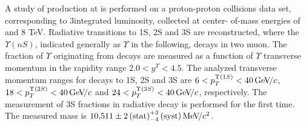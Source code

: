 A study of \chib production at \lhcb is performed on a proton-proton collisions
data set, corresponding to 3\invfb integrated luminosity, collected at center-
of-mass energies of  and 8 TeV. Radiative \chib transitions to
\Y1S, \Y2S and \Y3S are reconstructed, where the $\Upsilon(nS)$, indicated generally as $\Upsilon$ in the following, decays in two muon. 
The fraction of $\Upsilon$ originating from \chib decays
are measured as a function of $\Upsilon$ transverse momentum in the \lhcb rapidity range
$2.0 < y^{\Upsilon} < 4.5$. The analyzed transverse momentum ranges for decays
to \Y1S, \Y2S and \Y3S are $6<p_T^{\Y1S}<40\gevc$, $18<p_T^{\Y2S}<40\gevc$ and
$24<p_T^{\Y3S}<40\gevc$, respectively. The measurement of
\Y3S fractions in radiative \chibThreeP decay is performed for the first time.
The measured \chiboneThreeP mass is $10{,}511 \pm 2\mathrm{\,(stat)}^{+3}_{-4}\mathrm{\,(syst)} {\mathrm{\,Me\kern -0.1em V\!/}c^2}$.

